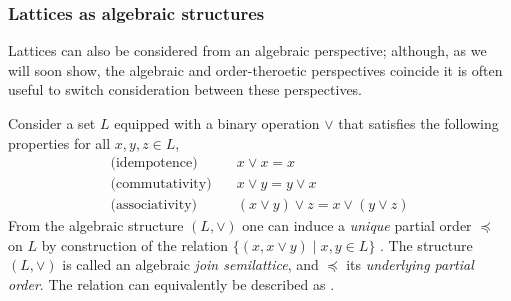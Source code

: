 \subsubsection{Lattices as algebraic structures}
\label{subsubsection:lattices-as-algebraic-structures}

Lattices can also be considered from an algebraic perspective; although, as we will soon show, the algebraic and order-theroetic perspectives coincide it is often useful to switch consideration between these perspectives. 

Consider a set $L$ equipped with a binary operation $\vee$ that satisfies the following properties for all $x,y,z \in L$, 
%
\begin{align}
  \text{(idempotence)} & \quad x \vee x = x \label{eq:idempotence} \\
  \text{(commutativity)} & \quad x \vee y = y \vee x \label{eq:commutativity} \\
  \text{(associativity)} & \quad (x \vee y) \vee z = x \vee (y \vee z) \label{eq:associativity}
\end{align}
%
From the algebraic structure $(L, \vee)$ one can induce a \textit{unique} partial order $\preceq$ on $L$ by construction of the relation $\{(x, x \vee y) \mid x,y \in L \}$ \cite[pp. 173]{bergman2015invitation}. The structure $(L, \vee)$ is called an algebraic \textit{join semilattice}, and $\preceq$ its \textit{underlying partial order}. The relation can equivalently be described as  \cite[pp.173]{bergman2015invitation}.
%
